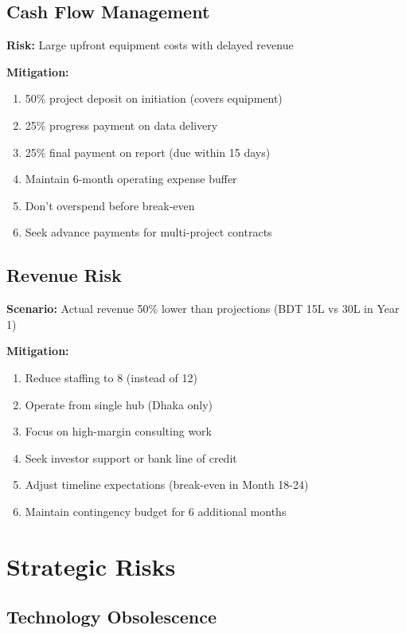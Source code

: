 \subsection{Cash Flow Management}

\textbf{Risk:} Large upfront equipment costs with delayed revenue

\textbf{Mitigation:}
\begin{enumerate}
    \item 50\% project deposit on initiation (covers equipment)
    \item 25\% progress payment on data delivery
    \item 25\% final payment on report (due within 15 days)
    \item Maintain 6-month operating expense buffer
    \item Don't overspend before break-even
    \item Seek advance payments for multi-project contracts
\end{enumerate}

\subsection{Revenue Risk}

\textbf{Scenario:} Actual revenue 50\% lower than projections (BDT 15L vs 30L in Year 1)

\textbf{Mitigation:}
\begin{enumerate}
    \item Reduce staffing to 8 (instead of 12)
    \item Operate from single hub (Dhaka only)
    \item Focus on high-margin consulting work
    \item Seek investor support or bank line of credit
    \item Adjust timeline expectations (break-even in Month 18-24)
    \item Maintain contingency budget for 6 additional months
\end{enumerate}

\section{Strategic Risks}

\subsection{Technology Obsolescence}

